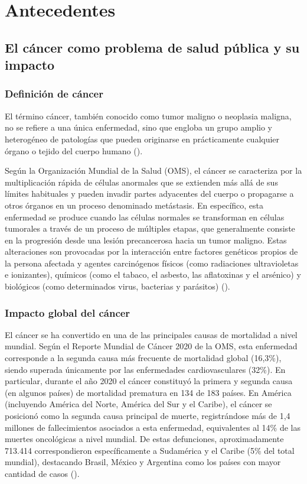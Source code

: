 \chapter{Antecedentes}
\label{cap:antecedentes}

\section{El cáncer como problema de salud pública y su impacto}

\subsection{Definición de cáncer}

El término cáncer, también conocido como tumor maligno o neoplasia maligna, no se refiere a una única enfermedad, sino que engloba un grupo amplio y heterogéneo de patologías que pueden originarse en prácticamente cualquier órgano o tejido del cuerpo humano (\cite{oms2022_cancer}).

Según la Organización Mundial de la Salud (OMS), el cáncer se caracteriza por la multiplicación rápida de células anormales que se extienden más allá de sus límites habituales y pueden invadir partes adyacentes del cuerpo o propagarse a otros órganos en un proceso denominado metástasis. En específico, esta enfermedad se produce cuando las células normales se transforman en células tumorales a través de un proceso de múltiples etapas, que generalmente consiste en la progresión desde una lesión precancerosa hacia un tumor maligno. Estas alteraciones son provocadas por la interacción entre factores genéticos propios de la persona afectada y agentes carcinógenos físicos (como radiaciones ultravioletas e ionizantes), químicos (como el tabaco, el asbesto, las aflatoxinas y el arsénico) y biológicos (como determinados virus, bacterias y parásitos) (\cite{oms2022_cancer}).


\subsection{Impacto global del cáncer}

El cáncer se ha convertido en una de las principales causas de mortalidad a nivel mundial. Según el Reporte Mundial de Cáncer 2020 de la OMS, esta enfermedad corresponde a la segunda causa más frecuente de mortalidad global (16,3\%), siendo superada únicamente por las enfermedades cardiovasculares (32\%). En particular, durante el año 2020 el cáncer constituyó la primera y segunda causa (en algunos países) de mortalidad prematura en 134 de 183 países. En América (incluyendo América del Norte, América del Sur y el Caribe), el cáncer se posicionó como la segunda causa principal de muerte, registrándose más de 1,4 millones de fallecimientos asociados a esta enfermedad, equivalentes al 14\% de las muertes oncológicas a nivel mundial. De estas defunciones, aproximadamente 713.414 correspondieron específicamente a Sudamérica y el Caribe (5\% del total mundial), destacando Brasil, México y Argentina como los países con mayor cantidad de casos (\cite{minsal2022}).

